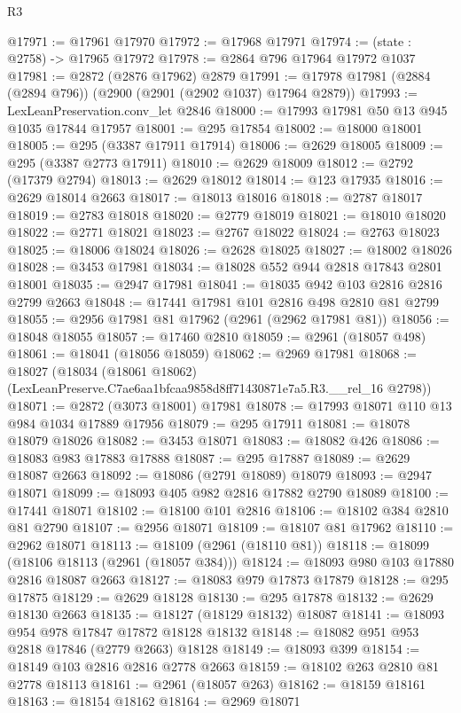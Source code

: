\begin{lexlean}{R3}
\begin{coremodule}
@17971 := @17961 @17970
@17972 := @17968 @17971
@17974 := (state : @2758) -> @17965 @17972
@17978 := @2864 @796 @17964 @17972 @1037
@17981 := @2872 (@2876 @17962) @2879
@17991 := @17978 @17981 (@2884 (@2894 @796)) (@2900 (@2901 (@2902 @1037) @17964 @2879))
@17993 := LexLeanPreservation.conv_let @2846
@18000 := @17993 @17981 @50 @13 @945 @1035 @17844 @17957
@18001 := @295 @17854
@18002 := @18000 @18001
@18005 := @295 (@3387 @17911 @17914)
@18006 := @2629 @18005
@18009 := @295 (@3387 @2773 @17911)
@18010 := @2629 @18009
@18012 := @2792 (@17379 @2794)
@18013 := @2629 @18012
@18014 := @123 @17935
@18016 := @2629 @18014 @2663
@18017 := @18013 @18016
@18018 := @2787 @18017
@18019 := @2783 @18018
@18020 := @2779 @18019
@18021 := @18010 @18020
@18022 := @2771 @18021
@18023 := @2767 @18022
@18024 := @2763 @18023
@18025 := @18006 @18024
@18026 := @2628 @18025
@18027 := @18002 @18026
@18028 := @3453 @17981
@18034 := @18028 @552 @944 @2818 @17843 @2801 @18001
@18035 := @2947 @17981
@18041 := @18035 @942 @103 @2816 @2816 @2799 @2663
@18048 := @17441 @17981 @101 @2816 @498 @2810 @81 @2799
@18055 := @2956 @17981 @81 @17962 (@2961 (@2962 @17981 @81))
@18056 := @18048 @18055
@18057 := @17460 @2810
@18059 := @2961 (@18057 @498)
@18061 := @18041 (@18056 @18059)
@18062 := @2969 @17981
@18068 := @18027
    (@18034 (@18061 @18062) (LexLeanPreserve.C7ae6aa1bfcaa9858d8ff71430871e7a5.R3.__rel_16 @2798))
@18071 := @2872 (@3073 @18001) @17981
@18078 := @17993 @18071 @110 @13 @984 @1034 @17889 @17956
@18079 := @295 @17911
@18081 := @18078 @18079 @18026
@18082 := @3453 @18071
@18083 := @18082 @426
@18086 := @18083 @983 @17883 @17888
@18087 := @295 @17887
@18089 := @2629 @18087 @2663
@18092 := @18086 (@2791 @18089) @18079
@18093 := @2947 @18071
@18099 := @18093 @405 @982 @2816 @17882 @2790 @18089
@18100 := @17441 @18071
@18102 := @18100 @101 @2816
@18106 := @18102 @384 @2810 @81 @2790
@18107 := @2956 @18071
@18109 := @18107 @81 @17962
@18110 := @2962 @18071
@18113 := @18109 (@2961 (@18110 @81))
@18118 := @18099 (@18106 @18113 (@2961 (@18057 @384)))
@18124 := @18093 @980 @103 @17880 @2816 @18087 @2663
@18127 := @18083 @979 @17873 @17879
@18128 := @295 @17875
@18129 := @2629 @18128
@18130 := @295 @17878
@18132 := @2629 @18130 @2663
@18135 := @18127 (@18129 @18132) @18087
@18141 := @18093 @954 @978 @17847 @17872 @18128 @18132
@18148 := @18082 @951 @953 @2818 @17846 (@2779 @2663) @18128
@18149 := @18093 @399
@18154 := @18149 @103 @2816 @2816 @2778 @2663
@18159 := @18102 @263 @2810 @81 @2778 @18113
@18161 := @2961 (@18057 @263)
@18162 := @18159 @18161
@18163 := @18154 @18162
@18164 := @2969 @18071

\end{coremodule}
\end{lexlean}
